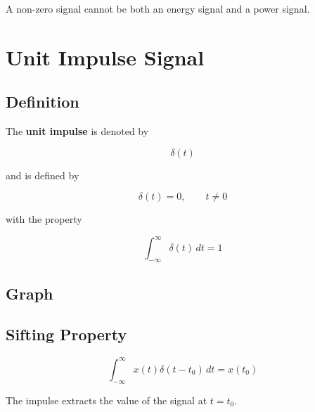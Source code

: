 A non-zero signal cannot be both an energy signal and a power signal.


\section{Unit Impulse Signal}


\subsection{Definition}

The \textbf{unit impulse} is denoted by

\[
\boxed{
\delta(t)
}
\]

and is defined by

\[
\delta(t)=0,\qquad t\neq0
\]

with the property

\[
\boxed{
\int_{-\infty}^{\infty}\delta(t)\,dt=1
}
\]


\subsection{Graph}

\begin{center}
\end{center}


\subsection{Sifting Property}

\[
\boxed{
\int_{-\infty}^{\infty}x(t)\delta(t-t_0)\,dt=x(t_0)
}
\]

The impulse extracts the value of the signal at \(t=t_0\).

